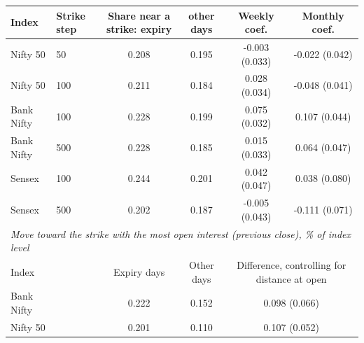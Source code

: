 \begin{tabular}{llcccc}
\toprule
Index & Strike step & Share near a strike: expiry & other days & Weekly coef. & Monthly coef. \\
\midrule
Nifty 50 & 50 & 0.208 & 0.195 & -0.003 (0.033) & -0.022 (0.042) \\
Nifty 50 & 100 & 0.211 & 0.184 & 0.028 (0.034) & -0.048 (0.041) \\
Bank Nifty & 100 & 0.228 & 0.199 & 0.075 (0.032) & 0.107 (0.044) \\
Bank Nifty & 500 & 0.228 & 0.185 & 0.015 (0.033) & 0.064 (0.047) \\
Sensex & 100 & 0.244 & 0.201 & 0.042 (0.047) & 0.038 (0.080) \\
Sensex & 500 & 0.202 & 0.187 & -0.005 (0.043) & -0.111 (0.071) \\
\midrule
\multicolumn{6}{l}{\emph{Move toward the strike with the most open interest (previous close), \% of index level}} \\
Index & & Expiry days & Other days & \multicolumn{2}{c}{Difference, controlling for distance at open} \\
Bank Nifty & & 0.222 & 0.152 & \multicolumn{2}{c}{0.098 (0.066)} \\
Nifty 50 & & 0.201 & 0.110 & \multicolumn{2}{c}{0.107 (0.052)} \\
\bottomrule
\end{tabular}